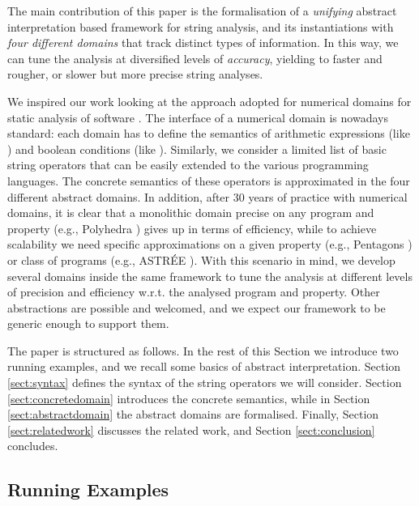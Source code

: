 \documentclass[orivec]{llncs}
\begin{document}
The main contribution of this paper is the formalisation of a \emph{unifying} abstract interpretation based framework for string analysis, and its instantiations with \emph{four different domains} that track distinct types of information. In this way, we can tune the analysis at diversified levels of \emph{accuracy}, yielding to faster and rougher, or slower but more precise string analyses.

We inspired our work looking at the approach adopted for numerical domains for static analysis of software \cite{CH78,GRA91,MIN06}. The interface of a numerical domain is nowadays standard: each domain has to define the semantics of arithmetic expressions (like ) and boolean conditions (like ). Similarly, we consider a limited list of basic string operators that can be easily extended to the various programming languages. The concrete semantics of these operators is approximated in the four different abstract domains. In addition, after 30 years of practice with numerical domains, it is clear that a monolithic domain precise on any program and property (e.g., Polyhedra \cite{CH78}) gives up in terms of efficiency, while to achieve scalability we need specific approximations on a given property (e.g., Pentagons \cite{LOG08}) or class of programs (e.g., ASTR\'EE \cite{CCF05}). With this scenario in mind, we develop several domains inside the same framework to tune the analysis at different levels of precision and efficiency w.r.t. the analysed program and property. Other abstractions are possible and welcomed, and we expect our framework to be generic enough to support them.

The paper is structured as follows. In the rest of this Section we introduce two running examples, and we recall some basics of abstract interpretation. Section \ref{sect:syntax} defines the syntax of the string operators we will consider. Section \ref{sect:concretedomain} introduces the concrete semantics, while in Section \ref{sect:abstractdomain} the abstract domains are formalised. Finally, Section \ref{sect:relatedwork} discusses the related work, and Section \ref{sect:conclusion} concludes.

 
 
\subsection{Running Examples}
\label{sect:runningexample}
\end{document}

